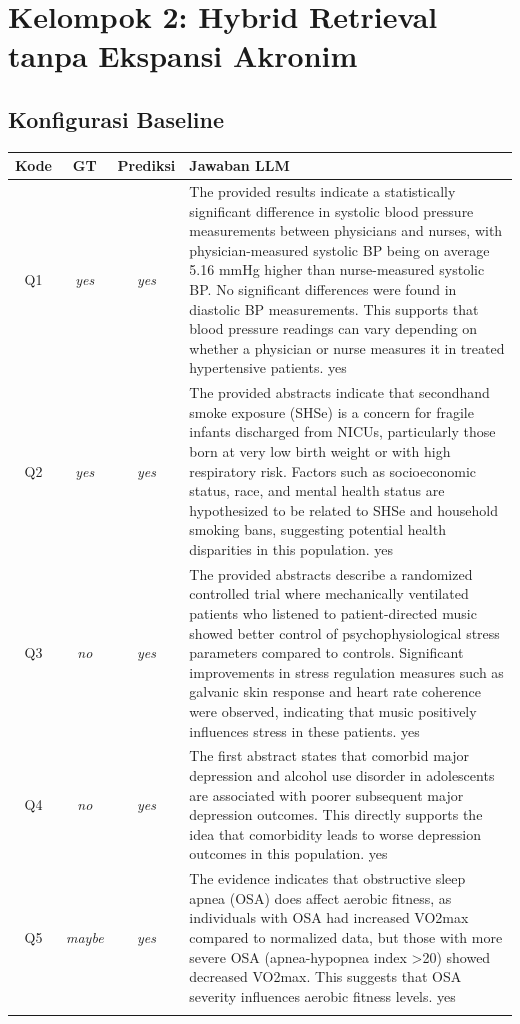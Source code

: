 \section{Kelompok 2: Hybrid Retrieval tanpa Ekspansi Akronim}

\subsection*{Konfigurasi Baseline}
\begin{longtable}{@{}c c c >{\raggedright\arraybackslash}p{8.8cm}@{}}
\toprule
\textbf{Kode} & \textbf{GT} & \textbf{Prediksi} & \textbf{Jawaban LLM} \\
\midrule\endhead
Q1 & \textit{yes} & \textit{yes} & The provided results indicate a statistically significant difference in systolic blood pressure measurements between physicians and nurses, with physician-measured systolic BP being on average 5.16 mmHg higher than nurse-measured systolic BP. No significant differences were found in diastolic BP measurements. This supports that blood pressure readings can vary depending on whether a physician or nurse measures it in treated hypertensive patients. yes \\
\addlinespace
Q2 & \textit{yes} & \textit{yes} & The provided abstracts indicate that secondhand smoke exposure (SHSe) is a concern for fragile infants discharged from NICUs, particularly those born at very low birth weight or with high respiratory risk. Factors such as socioeconomic status, race, and mental health status are hypothesized to be related to SHSe and household smoking bans, suggesting potential health disparities in this population. yes \\
\addlinespace
Q3 & \textit{no} & \textit{yes} & The provided abstracts describe a randomized controlled trial where mechanically ventilated patients who listened to patient-directed music showed better control of psychophysiological stress parameters compared to controls. Significant improvements in stress regulation measures such as galvanic skin response and heart rate coherence were observed, indicating that music positively influences stress in these patients. yes \\
\addlinespace
Q4 & \textit{no} & \textit{yes} & The first abstract states that comorbid major depression and alcohol use disorder in adolescents are associated with poorer subsequent major depression outcomes. This directly supports the idea that comorbidity leads to worse depression outcomes in this population. yes \\
\addlinespace
Q5 & \textit{maybe} & \textit{yes} & The evidence indicates that obstructive sleep apnea (OSA) does affect aerobic fitness, as individuals with OSA had increased VO2max compared to normalized data, but those with more severe OSA (apnea-hypopnea index >20) showed decreased VO2max. This suggests that OSA severity influences aerobic fitness levels. yes \\
\addlinespace
\bottomrule
\end{longtable}


